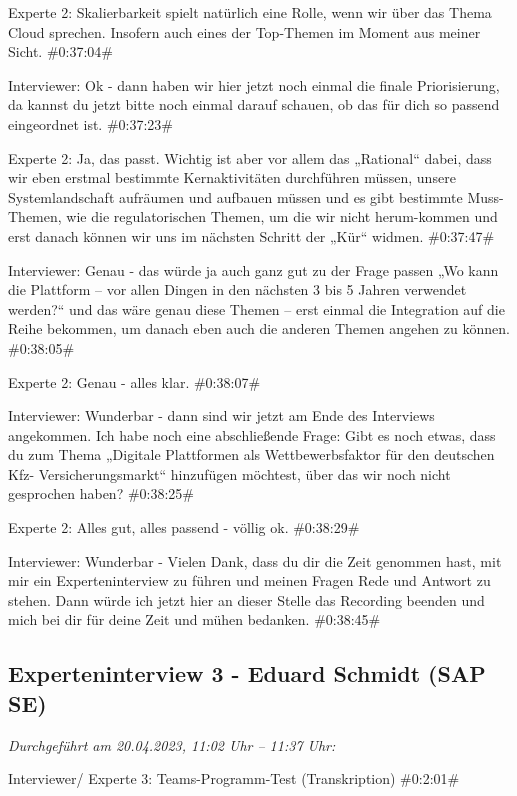 Experte 2:
Skalierbarkeit spielt natürlich eine Rolle, wenn wir über das Thema Cloud sprechen. Insofern auch eines der Top-Themen im Moment aus meiner Sicht.
\#0:37:04\#

Interviewer:
Ok - dann haben wir hier jetzt noch einmal die finale Priorisierung, da kannst du jetzt bitte noch einmal darauf schauen, ob das für dich so passend eingeordnet ist.
\#0:37:23\#

Experte 2:
Ja, das passt. Wichtig ist aber vor allem das „Rational“ dabei, dass wir eben erstmal bestimmte Kernaktivitäten durchführen müssen, unsere Systemlandschaft aufräumen und aufbauen müssen und es gibt bestimmte Muss-Themen, wie die regulatorischen Themen, um die wir nicht herum-kommen und erst danach können wir uns im nächsten Schritt der „Kür“ widmen. 
\#0:37:47\#

Interviewer:
Genau - das würde ja auch ganz gut zu der Frage passen „Wo kann die Plattform – vor allen Dingen in den nächsten 3 bis 5 Jahren verwendet werden?“ und das wäre genau diese Themen – erst einmal die Integration auf die Reihe bekommen, um danach eben auch die anderen Themen angehen zu können.
\#0:38:05\#

Experte 2:
Genau - alles klar.
\#0:38:07\#

Interviewer:
Wunderbar - dann sind wir jetzt am Ende des Interviews angekommen. Ich habe noch eine abschließende Frage: Gibt es noch etwas, dass du zum Thema „Digitale Plattformen als Wettbewerbsfaktor für den deutschen Kfz- Versicherungsmarkt“ hinzufügen möchtest, über das wir noch nicht gesprochen haben?
\#0:38:25\#

Experte 2:
Alles gut, alles passend - völlig ok.
\#0:38:29\#

Interviewer:
Wunderbar - Vielen Dank, dass du dir die Zeit genommen hast, mit mir ein Experteninterview zu führen und meinen Fragen Rede und Antwort zu stehen. Dann würde ich jetzt hier an dieser Stelle das Recording beenden und mich bei dir für deine Zeit und mühen bedanken.
\#0:38:45\#



\newpage
\subsection{Experteninterview 3 - Eduard Schmidt (SAP SE)}

\textit{Durchgeführt am 20.04.2023, 11:02 Uhr -- 11:37 Uhr:}

Interviewer/ Experte 3:
Teams-Programm-Test (Transkription)
\#0:2:01\#

